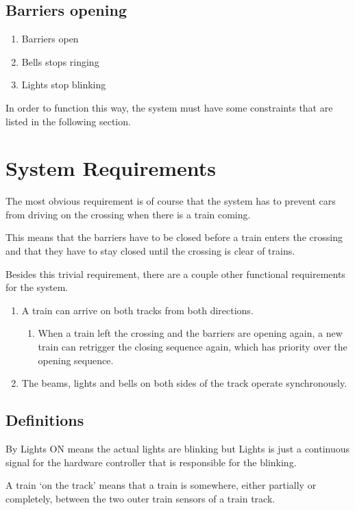 \documentclass[final]{report}
\begin{document}
\subsection{Barriers opening}
\begin{enumerate}
\item Barriers open
\item Bells stops ringing
\item Lights stop blinking
\end{enumerate}

In order to function this way, the system must have some constraints that are listed in the following section.


\section{System Requirements}
The most obvious requirement is of course that the system has to prevent cars from driving on the crossing when there is a train coming.

This means that the barriers have to be closed before a train enters the crossing and that they have to stay closed until the crossing is clear of trains.

Besides this trivial requirement, there are a couple other functional requirements for the system.

\begin{enumerate}
\item A train can arrive on both tracks from both directions.
	\begin{enumerate}
	\item When a train left the crossing and the barriers are opening again, a new train can retrigger the closing sequence again, which has priority over the opening sequence.
	\end{enumerate}

\item The beams, lights and bells on both sides of the track operate synchronously.
\end{enumerate}

\subsection{Definitions}
By Lights ON means the actual lights are blinking but Lights is just a continuous signal for the hardware controller that is responsible for the blinking.

A train `on the track' means that a train is somewhere, either partially or completely, between the two outer train sensors of a train track.
\end{document}

